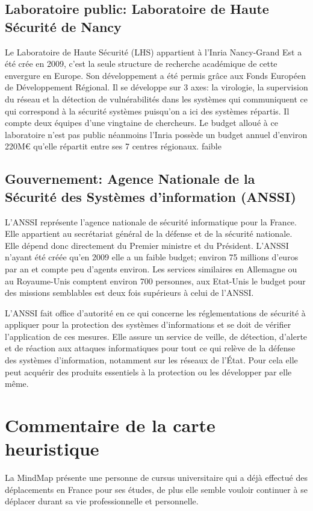 \documentclass[a4paper,12pt]{article}
\begin{document}
\subsection{Laboratoire public: Laboratoire de Haute Sécurité de Nancy}
Le Laboratoire de Haute Sécurité (LHS) appartient à l'Inria Nancy-Grand Est a été crée en 2009, c'est la seule structure de recherche académique de cette envergure en Europe. Son développement a été permis gr\^ace aux Fonds Européen de Développement Régional. Il se développe sur 3 axes: la virologie, la supervision du réseau et la détection de vulnérabilités dans les systèmes qui communiquent ce qui correspond à la sécurité systèmes puisqu'on a ici des systèmes répartis. Il compte deux équipes d'une vingtaine de chercheurs. Le budget alloué à ce laboratoire n'est pas public néanmoins l'Inria possède un budget annuel d'environ 220M€ qu'elle répartit entre ses 7 centres régionaux.
faible

\newpage
\subsection{Gouvernement: Agence Nationale de la Sécurité des Systèmes d'information (ANSSI)}
L'ANSSI représente l'agence nationale de sécurité informatique pour la France. Elle appartient au secrétariat général de la défense et de la sécurité nationale. Elle dépend donc directement du Premier ministre et du Président.  L'ANSSI n'ayant été créée qu'en 2009 elle a un faible budget; environ 75 millions d'euros par an et compte peu d'agents environ. Les services similaires en Allemagne ou au Royaume-Unis comptent environ 700 personnes, aux Etat-Unis le budget pour des missions semblables est deux fois supérieurs à celui de l'ANSSI.

L'ANSSI fait office d'autorité en ce qui concerne les réglementations de sécurité à appliquer pour la protection des systèmes d'informations et se doit de vérifier l'application de ces mesures. Elle assure un service de veille, de détection, d’alerte et de réaction aux attaques informatiques pour tout ce qui relève de la défense des systèmes d'information, notamment sur les réseaux de l’État. Pour cela elle peut acquérir des produits essentiels à la protection ou les développer par elle m\^eme.

\newpage
\section{Commentaire de la carte heuristique}
La MindMap présente une personne de cursus universitaire qui a déjà effectué des déplacements en France pour ses études, de plus elle semble vouloir continuer à se déplacer durant sa vie professionnelle et personnelle. 
\end{document}
